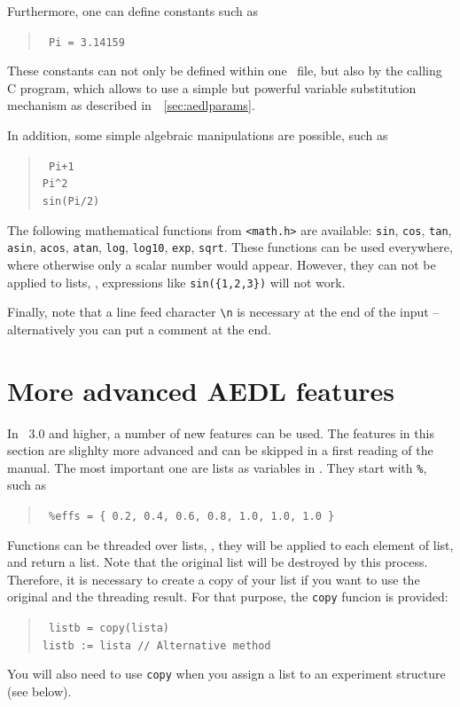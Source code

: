 Furthermore, one can define constants such as
\begin{quote}
{\tt
Pi = 3.14159
}
\end{quote}
These constants can not only be defined within one \AEDL\ file, but also
by the calling C program, which allows to use a simple but powerful variable
substitution mechanism as described in~\Sec~\ref{sec:aedlparams}.

In addition, some simple algebraic manipulations are possible, such as
\begin{quote}
{\tt
Pi+1\\
\verb+Pi^2+\\
sin(Pi/2)
}
\end{quote}
The following mathematical functions from {\tt <math.h>} are available: 
{\tt sin}, {\tt cos}, {\tt tan}, {\tt asin}, {\tt acos}, {\tt atan}, 
{\tt log}, {\tt log10}, {\tt exp}, {\tt sqrt}.
%
%
%
%
%
%
%
%
%
%
% 
These functions can be used everywhere, where
otherwise only a scalar number would appear. However, they can not be
applied to lists, \ie, expressions like {\tt sin(\{1,2,3\})} will not work. 

Finally, note that a line feed character \verb+\n+ is necessary at
 the end of the input -- alternatively you can put a comment at the end.

\section{More advanced AEDL features}
\label{sec:advaedl}

In \GLOBES\ 3.0 and higher, a number of new features can be used. The
features in this section are slighlty more advanced and can be skipped in a first reading of
the manual. The
most important one are lists as variables in \AEDL . They start with {\tt \%}, such as
\begin{quote}
{\tt
\%effs = \{ 0.2, 0.4, 0.6, 0.8, 1.0, 1.0, 1.0 \}
}
\end{quote}
Functions can be threaded over lists, \ie, they will be applied to each element
of list, and return a list. Note that the original list will be destroyed by this
process. Therefore, it is necessary to create a copy of your list if you want to
use the original and the threading result. For that purpose, the {\tt copy}
funcion is provided:
\begin{quote}
{\tt
 listb = copy(lista) \\
 listb := lista // Alternative method 
}
\end{quote}
You will also need to use {\tt copy} when you assign a list to an experiment structure (see below).

